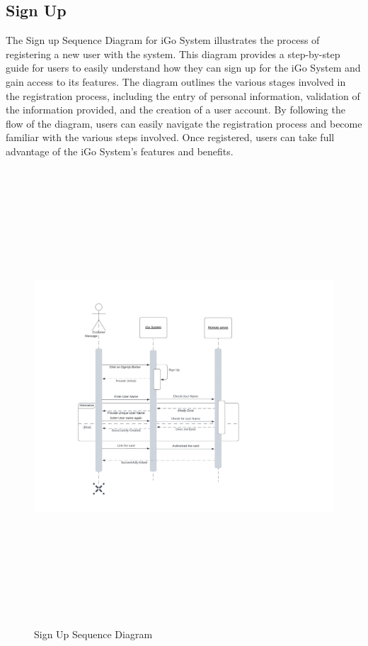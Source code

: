 \documentclass[a4paper, 11pt]{report}
\begin{document}
\subsection{Sign Up}
The Sign up Sequence Diagram for iGo System illustrates the process of registering a new user with the system. This diagram provides a step-by-step guide for users to easily understand how they can sign up for the iGo System and gain access to its features. The diagram outlines the various stages involved in the registration process, including the entry of personal information, validation of the information provided, and the creation of a user account. By following the flow of the diagram, users can easily navigate the registration process and become familiar with the various steps involved. Once registered, users can take full advantage of the iGo System's features and benefits. 
\begin{figure}[h]
    \renewcommand{\thefigure}{7.2.2}
    \hspace{-2cm}
    \includegraphics[scale=0.7,height=17cm]{SignUp.jpeg}
    \caption{Sign Up Sequence Diagram}
\end{figure}
\clearpage
\end{document}
